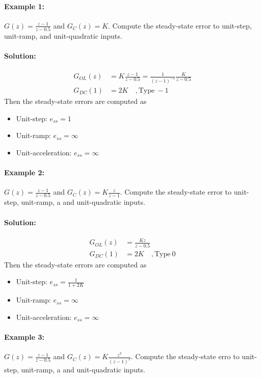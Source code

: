 \documentclass[twoside]{article}
\begin{document}
\paragraph{Example 1:} $G(z) = \frac{z-1}{z-0.5}$ and $G_C(z) =
K$. Compute the steady-state error to unit-step, unit-ramp,
and unit-quadratic inputs.

\paragraph{Solution:} 
%
\begin{align*}
G_{OL}(z) &= K \frac{z-1}{z-0.5} = \frac{1}{(z-1)^{-1}} \frac{K}{z-0.5}
\\
G_{DC}(1) &= 2 K \quad, \mathrm{Type} \ -1 
\end{align*}
%
Then the steady-state errors are computed as
\begin{itemize}
\item Unit-step: $e_{ss} = 1$
\item Unit-ramp: $e_{ss} = \infty$
\item Unit-acceleration: $e_{ss} = \infty$
\end{itemize}

\paragraph{Example 2:} $G(z) = \frac{z-1}{z-0.5}$ and $G_C(z) =
K \frac{z}{z-1}$. Compute the steady-state error to unit-step, unit-ramp, a
and unit-quadratic inputs.

\paragraph{Solution:} 
%
\begin{align*}
G_{OL}(z) &= \frac{K z}{z-0.5} 
\\
G_{DC}(1) &= 2 K \quad, \mathrm{Type} \ 0 
\end{align*}
%
Then the steady-state errors are computed as
%
\begin{itemize}
\item Unit-step: $e_{ss} = \frac{1}{1 + 2 K}$
\item Unit-ramp: $e_{ss} = \infty$
\item Unit-acceleration: $e_{ss} = \infty$
\end{itemize}

\paragraph{Example 3:} $G(z) = \frac{z-1}{z-0.5}$ and $G_C(z) =
K \frac{z^2}{(z-1)^2}$. Compute the steady-state erro to unit-step, unit-ramp, a
and unit-quadratic inputs.
\end{document}
